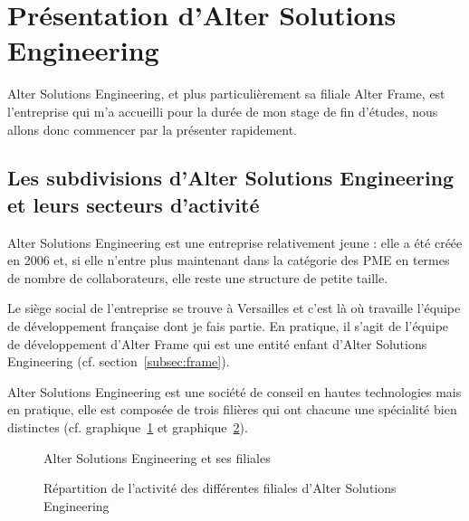 \section{Présentation d'Alter Solutions Engineering}
Alter Solutions Engineering, et plus particulièrement sa filiale Alter Frame, est l'entreprise qui m'a accueilli pour la durée de mon stage de fin d'études, nous allons donc commencer par la présenter rapidement.

\subsection{Les subdivisions d'Alter Solutions Engineering et leurs secteurs d'activité}
Alter Solutions Engineering est une entreprise relativement jeune : elle a été créée en 2006 et, si elle n'entre plus maintenant dans la catégorie des PME en termes de nombre de collaborateurs, elle reste une structure de petite taille.

Le siège social de l'entreprise se trouve à Versailles et c'est là où travaille l'équipe de développement française dont je fais partie. En pratique, il s'agit de l'équipe de développement d'Alter Frame qui est une entité enfant d'Alter Solutions Engineering (cf. section~\ref{subsec:frame}).

Alter Solutions Engineering est une société de conseil en hautes technologies mais en pratique, elle est composée de trois filières qui ont chacune une spécialité bien distinctes (cf. graphique~\ref{fig:filiales} et graphique~\ref{fig:activite}).
\begin{figure}
	\centering
	\caption{Alter Solutions Engineering et ses filiales}
	\label{fig:filiales}
\end{figure}
\begin{figure}
	\caption{Répartition de l'activité des différentes filiales d'Alter Solutions Engineering}
	\label{fig:activite}
\end{figure}

